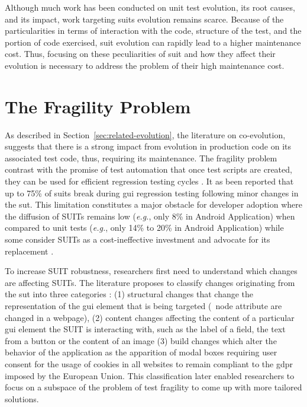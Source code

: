 Although much work has been conducted on unit test evolution, its root causes, and its impact, work targeting \gls{suit}s evolution remains scarce. Because of the particularities in terms of interaction with the code, structure of the test, and the portion of code exercised, \gls{suit} evolution can rapidly lead to a higher maintenance cost. Thus, focusing on these peculiarities of \gls{suit} and how they affect their evolution is necessary to address the problem of their high maintenance cost.

\section{The Fragility Problem}
\label{sec:related-fragility}

As described in Section~\ref{sec:related-evolution}, the literature on co-evolution, suggests that there is a strong impact from evolution in production code on its associated test code, thus, requiring its maintenance. The fragility problem contrast with the promise of test automation that once test scripts are created, they can be used for efficient regression testing cycles \cite{Yandrapally2014}.  It as been reported that up to 75\% of \gls{suit}s break during \gls{gui} regression testing \cite{Memon2003a, Grechanik2009, Coppola2016} following minor changes in the \gls{sut}. This limitation constitutes a major obstacle for developer adoption where the diffusion of SUITs remains low (\emph{e.g.}, only 8\% \cite{Coppola2017, Coppola2019b} in Android Application) when compared to unit tests (\emph{e.g.}, only 14\% \cite{Kochhar2015} to 20\% \cite{Coppola2017, Coppola2019b} in Android Application) while some consider SUITs as a cost-ineffective investment and advocate for its replacement \cite{Vliegendhart2012, Chen2020}.

To increase SUIT robustness, researchers first need to understand which changes are affecting SUITs. The literature proposes to classify changes originating from the \gls{sut} into three categories \cite{Choudhary2011, Yandrapally2014, Coppola2016}: (1) structural changes that change the representation of the \gls{gui} element that is being targeted (\eg\ node attribute are changed in a webpage), (2) content changes affecting the content of a particular \gls{gui} element the SUIT is interacting with, such as the label of a field, the text from a button or the content of an image (3) build changes which alter the behavior of the application as the apparition of modal boxes requiring user consent for the usage of cookies in all websites to remain compliant to the \gls{gdpr} imposed by the European Union. This classification later enabled researchers to focus on a subspace of the problem of test fragility to come up with more tailored solutions.

